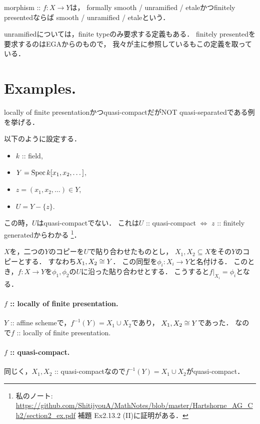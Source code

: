 \documentclass[a4paper, dvipdfmx]{jsarticle}
\begin{document}
\begin{Def}
    morphism :: $f \colon X \to Y$は，
    formally smooth / unramified / etaleかつfinitely presentedならば
    smooth / unramified / etaleという．
\end{Def}
unramifiedについては，finite typeのみ要求する定義もある．
finitely presentedを要求するのはEGAからのもので，
我々が主に参照している\cite{ASS}もこの定義を取っている．

\section{Examples.}

\begin{Example}\label{example:not_qsep}
    locally of finite presentationかつquasi-compactだがNOT quasi-separatedである例を挙げる．

    以下のように設定する．
    \begin{itemize}
        \item $k$ :: field,
        \item $Y=\operatorname{Spec} k[x_1,x_2,\dots]$,
        \item $z=(x_1, x_2, \dots) \in Y$,
        \item $U=Y-\{z\}$.
    \end{itemize}
    この時，$U$はquasi-compactでない．
    これは$U$ :: quasi-compact $\iff$ $z$ :: finitely generatedからわかる
    \footnote
        {
            私のノート: \url{https://github.com/ShitijyouA/MathNotes/blob/master/Hartshorne_AG_Ch2/section2_ex.pdf}
            補題 Ex2.13.2 (II)に証明がある．
        }．

    $X$を，二つの$Y$のコピーを$U$で貼り合わせたものとし，
    $X_1, X_2 \subseteq X$をその$Y$のコピーとする．
    すなわち$X_1, X_2 \cong Y$．
    この同型を$\phi_i \colon X_i \to Y$と名付ける．
    このとき，$f \colon X \to Y$を$\phi_1, \phi_2$の$U$に沿った貼り合わせとする．
    こうすると$f|_{X_i}=\phi_i$となる．

    \paragraph{$f$ :: locally of finite presentation.}
    $Y$ :: affine schemeで，$f^{-1}(Y)=X_1 \cup X_2$であり，
    $X_1, X_2 \cong Y$であった．
    なので$f$ :: locally of finite presentation.

    \paragraph{$f$ :: quasi-compact.}
    同じく，$X_1, X_2$ :: quasi-compactなので$f^{-1}(Y)=X_1 \cup X_2$がquasi-compact．


\end{Example}
\end{document}
